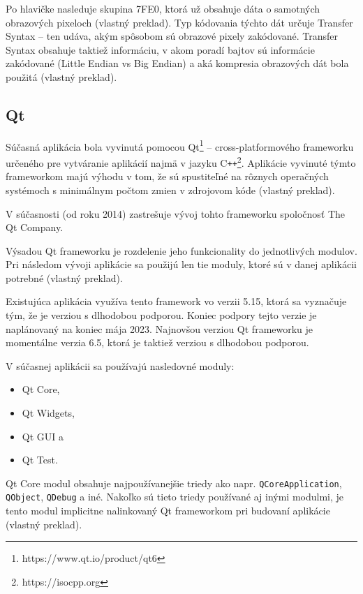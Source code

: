Po hlavičke nasleduje skupina 7FE0, ktorá už obsahuje dáta o samotných obrazových pixeloch \cite{Varma_2012} (vlastný preklad). Typ kódovania týchto dát určuje Transfer Syntax -- ten udáva, akým spôsobom sú obrazové pixely zakódované. Transfer Syntax obsahuje taktiež informáciu, v akom poradí bajtov sú informácie zakódované (Little Endian vs Big Endian) a aká kompresia obrazových dát bola použitá \cite{dicom_transfer_syntax} (vlastný preklad).

\subsection {Qt}
Súčasná aplikácia bola vyvinutá pomocou Qt\footnote{https://www.qt.io/product/qt6} -- cross-platformového frameworku určeného pre vytváranie aplikácií najmä v jazyku C\texttt{++}\footnote{https://isocpp.org}. Aplikácie vyvinuté týmto frameworkom majú výhodu v tom, že sú spustiteľné na rôznych operačných systémoch s minimálnym počtom zmien v zdrojovom kóde \cite{qt_description} (vlastný preklad).

V súčasnosti (od roku 2014) zastrešuje vývoj tohto frameworku spoločnosť The Qt Company.

\clearpage

Výsadou Qt frameworku je rozdelenie jeho funkcionality do jednotlivých modulov. Pri následom vývoji aplikácie sa použijú len tie moduly, ktoré sú v danej aplikácii potrebné \cite{qt_description} (vlastný preklad).

Existujúca aplikácia využíva tento framework vo verzii 5.15, ktorá sa vyznačuje tým, že je verziou s dlhodobou podporou. Koniec podpory tejto verzie je naplánovaný na koniec mája 2023. Najnovšou verziou Qt frameworku je momentálne verzia 6.5, ktorá je taktiež verziou s dlhodobou podporou.

V súčasnej aplikácii sa používajú nasledovné moduly: 
\begin{itemize}
\item {Qt Core,}
\item {Qt Widgets,}
\item {Qt GUI a}
\item {Qt Test.}
\end{itemize}

Qt Core modul obsahuje najpoužívanejšie triedy ako napr. \texttt{QCoreApplication}, \texttt{QObject}, \texttt{QDebug} a iné. Nakoľko sú tieto triedy používané aj inými modulmi, je tento modul implicitne nalinkovaný Qt frameworkom pri budovaní aplikácie \cite{qtcore_description} (vlastný preklad).

